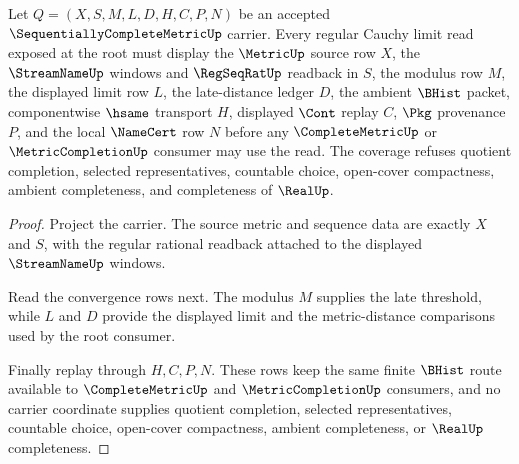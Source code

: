 \begin{theorem}
\label{thm:sequentially-complete-metric-regular-cauchy-limit-coverage}
Let $Q=(X,S,M,L,D,H,C,P,N)$ be an accepted $\SequentiallyCompleteMetricUp$ carrier. Every regular Cauchy limit read exposed at the root must display the $\MetricUp$ source row $X$, the $\StreamNameUp$ windows and $\RegSeqRatUp$ readback in $S$, the modulus row $M$, the displayed limit row $L$, the late-distance ledger $D$, the ambient $\BHist$ packet, componentwise $\hsame$ transport $H$, displayed $\Cont$ replay $C$, $\Pkg$ provenance $P$, and the local $\NameCert$ row $N$ before any $\CompleteMetricUp$ or $\MetricCompletionUp$ consumer may use the read. The coverage refuses quotient completion, selected representatives, countable choice, open-cover compactness, ambient completeness, and completeness of $\RealUp$.
\end{theorem}
\begin{proof}
Project the carrier. The source metric and sequence data are exactly $X$ and $S$, with the regular rational readback attached to the displayed $\StreamNameUp$ windows.

Read the convergence rows next. The modulus $M$ supplies the late threshold, while $L$ and $D$ provide the displayed limit and the metric-distance comparisons used by the root consumer.

Finally replay through $H,C,P,N$. These rows keep the same finite $\BHist$ route available to $\CompleteMetricUp$ and $\MetricCompletionUp$ consumers, and no carrier coordinate supplies quotient completion, selected representatives, countable choice, open-cover compactness, ambient completeness, or $\RealUp$ completeness.
\end{proof}

